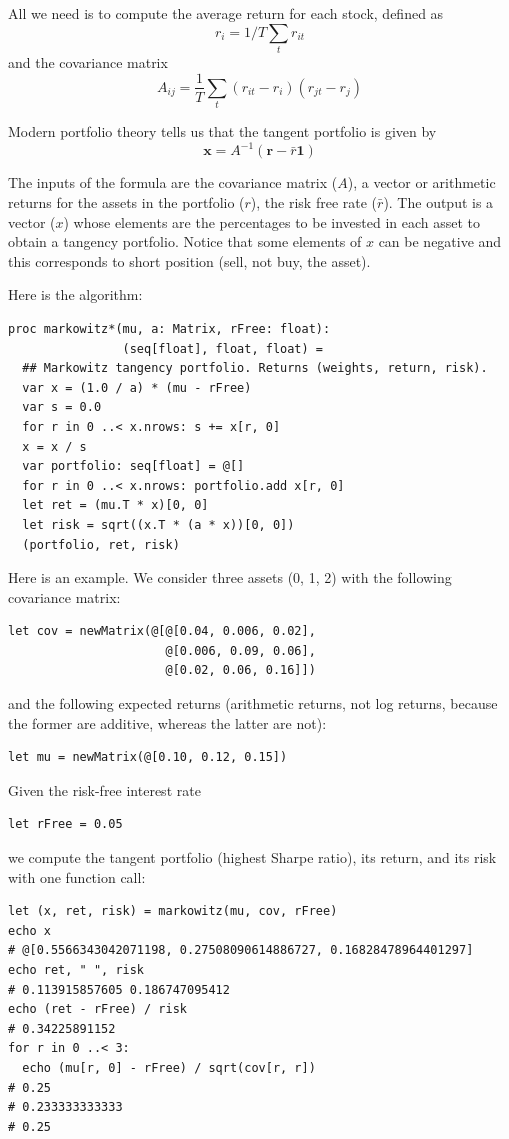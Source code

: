 \documentclass[justified, sixbynine]{tufte-book}
\def\ft{\small\tt}
\theoremstyle{plain}%
\newtheorem * {corollary}{Corollary}
\theoremstyle{definition}
\theoremstyle{remark}
\newtheorem * {remark}{Remark}
\newtheorem * {note}{Note}
\begin{document}
\begin{fullwidth}
All we need is to compute the average return for each stock, defined as
\begin{equation}
r_i = 1/T \sum_t r_{it}
\end{equation}
and the covariance matrix
\begin{equation}
A_{ij} = \frac1T \sum_t (r_{it}-r_i)(r_{jt}-r_j)
\end{equation}

Modern portfolio theory tells us that the tangent portfolio is given by
\begin{equation}
\mathbf{x}=A^{-1} ( \mathbf{r}-\bar{r}\mathbf{1})
\end{equation}

The inputs of the formula are the covariance matrix ($A$), a vector or arithmetic returns for the assets in the portfolio ($r$), the risk free rate ($\bar{r}$). The output is a vector ($x$) whose elements are the percentages to be invested in each asset to obtain a tangency portfolio. Notice that some elements of $x$ can be negative and this corresponds to short position (sell, not buy, the asset).

Here is the algorithm:

\begin{lstlisting}[caption={in file: {\ft nlib/finance.nim}}]
proc markowitz*(mu, a: Matrix, rFree: float):
                (seq[float], float, float) =
  ## Markowitz tangency portfolio. Returns (weights, return, risk).
  var x = (1.0 / a) * (mu - rFree)
  var s = 0.0
  for r in 0 ..< x.nrows: s += x[r, 0]
  x = x / s
  var portfolio: seq[float] = @[]
  for r in 0 ..< x.nrows: portfolio.add x[r, 0]
  let ret = (mu.T * x)[0, 0]
  let risk = sqrt((x.T * (a * x))[0, 0])
  (portfolio, ret, risk)
\end{lstlisting}

Here is an example.
We consider three assets (0, 1, 2) with the following covariance matrix:
\begin{lstlisting}
let cov = newMatrix(@[@[0.04, 0.006, 0.02],
                      @[0.006, 0.09, 0.06],
                      @[0.02, 0.06, 0.16]])
\end{lstlisting}
and the following expected returns (arithmetic returns, not log returns, because the former are additive, whereas the latter are not):
\begin{lstlisting}
let mu = newMatrix(@[0.10, 0.12, 0.15])
\end{lstlisting}
Given the risk-free interest rate
\begin{lstlisting}
let rFree = 0.05
\end{lstlisting}
we compute the tangent portfolio (highest Sharpe ratio), its return, and its risk with one function call:
\begin{lstlisting}
let (x, ret, risk) = markowitz(mu, cov, rFree)
echo x
# @[0.5566343042071198, 0.27508090614886727, 0.16828478964401297]
echo ret, " ", risk
# 0.113915857605 0.186747095412
echo (ret - rFree) / risk
# 0.34225891152
for r in 0 ..< 3:
  echo (mu[r, 0] - rFree) / sqrt(cov[r, r])
# 0.25
# 0.233333333333
# 0.25
\end{lstlisting}


\end{fullwidth}
\end{document}
